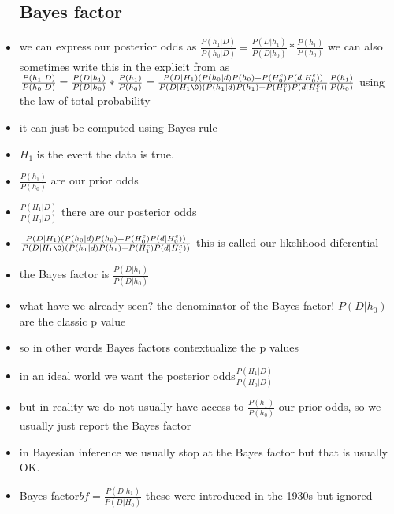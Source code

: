 \documentclass{article}
\begin{document}
\begin{itemize}
\subsection{Bayes factor}
\item we can express our posterior odds as $\frac{P(h_1|D)}{P(h_0|D)}=\frac{P(D|h_1)}{P(D|h_0)}*\frac{P(h_1)}{P(h_0)}$ we can also sometimes write this in the explicit from as $\frac{P(h_1|D)}{P(h_0|D)}=\frac{P(D|h_1)}{P(D|h_0)}*\frac{P(h_1)}{P(h_0)}=\frac{P(D|H_1)(P(h_0|d)P(h_0)+P(H_0^c)P(d|H_0^c))}{P(D|H_1\0)(P(h_1|d)P(h_1)+P(H_1^c)P(d|H_1^c))}\frac{P(h_1)}{P(h_0)}$ using the law of total probability
\item it can just be computed using Bayes rule
\item $H_1$ is the event the data is true.
\item $\frac{P(h_1)}{P(h_0)}$ are our prior odds
\item $\frac{P(H_1|D)}{P(H_0|D)}$ there are our posterior odds
\item $\frac{P(D|H_1)(P(h_0|d)P(h_0)+P(H_0^c)P(d|H_0^c))}{P(D|H_1\0)(P(h_1|d)P(h_1)+P(H_1^c)P(d|H_1^c))}$ this is called our likelihood diferential
\item the Bayes factor is $\frac{P(D|h_1)}{P(D|h_0)}$
\item what have we already seen? the denominator of the Bayes factor! $P(D|h_0)$ are the classic p value 
\item so in other words Bayes factors contextualize the p values
\item in an ideal world we want the posterior odds$\frac{P(H_1|D)}{P(H_0|D)}$
\item but in reality we do not usually have access to $\frac{P(h_1)}{P(h_0)}$  our prior odds, so we usually just report the Bayes factor
\item in Bayesian inference we usually stop at the Bayes factor but that is usually OK. 
\item Bayes factor$ bf=\frac{P(D|h_1)}{P(D|H_0)}$ these were introduced in the 1930s but ignored 

\end{itemize}
\end{document}
